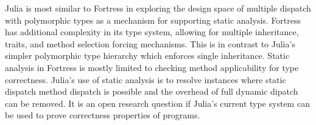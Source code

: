 Julia is most similar to Fortress in exploring the design space of multiple dispatch with polymorphic types as a mechanism for supporting static analysis. Fortress has additional complexity in its type system, allowing for multiple inheritance, traits, and method selection forcing mechanisms.  This is in contrast to Julia's simpler polymorphic type hierarchy which enforces single inheritance. Static analysis in Fortress is mostly limited to checking method applicability for type correctness.  Julia's use of static analysis is to resolve instances where static dispatch method dispatch is possible and the overhead of full dynamic dipatch can be removed.  It is an open research question if Julia's current type system can be used to prove correctness properties of programs.  



